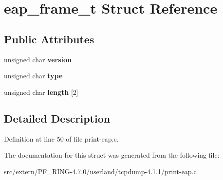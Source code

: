 \hypertarget{structeap__frame__t}{
\section{eap\_\-frame\_\-t Struct Reference}
\label{structeap__frame__t}
}
\subsection*{Public Attributes}
\begin{DoxyCompactItemize}
\item 
\hypertarget{structeap__frame__t_aa9b10240c44e322aaa384818205c1a3c}{
unsigned char {\bfseries version}}
\label{structeap__frame__t_aa9b10240c44e322aaa384818205c1a3c}

\item 
\hypertarget{structeap__frame__t_a41cdfd67d8fd29fda5be4a58b4a788b2}{
unsigned char {\bfseries type}}
\label{structeap__frame__t_a41cdfd67d8fd29fda5be4a58b4a788b2}

\item 
\hypertarget{structeap__frame__t_a08fc7678fbe8bde53b6765b779079b78}{
unsigned char {\bfseries length} \mbox{[}2\mbox{]}}
\label{structeap__frame__t_a08fc7678fbe8bde53b6765b779079b78}

\end{DoxyCompactItemize}


\subsection{Detailed Description}


Definition at line 50 of file print-\/eap.c.



The documentation for this struct was generated from the following file:\begin{DoxyCompactItemize}
\item 
src/extern/PF\_\-RING-\/4.7.0/userland/tcpdump-\/4.1.1/print-\/eap.c\end{DoxyCompactItemize}
